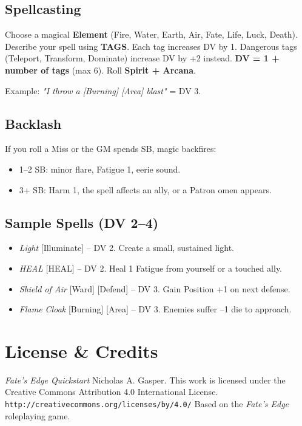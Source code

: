 \documentclass[10pt, twocolumn]{article}
\begin{document}
\subsection*{Spellcasting}
Choose a magical \textbf{Element} (Fire, Water, Earth, Air, Fate, Life, Luck, Death). Describe your spell using \textbf{TAGS}. Each tag increases DV by 1. Dangerous tags (Teleport, Transform, Dominate) increase DV by +2 instead.  
\textbf{DV = 1 + number of tags} (max 6). Roll \textbf{Spirit + Arcana}.

Example: \textit{"I throw a [Burning] [Area] blast"} = DV 3.

\subsection*{Backlash}
If you roll a Miss or the GM spends SB, magic backfires:
\begin{itemize}
\item 1--2 SB: minor flare, Fatigue 1, eerie sound.
\item 3+ SB: Harm 1, the spell affects an ally, or a Patron omen appears.
\end{itemize}

\subsection*{Sample Spells (DV 2--4)}
\begin{itemize}
\item \textit{Light} [Illuminate] -- DV 2. Create a small, sustained light.
\item \textit{HEAL} [HEAL] -- DV 2. Heal 1 Fatigue from yourself or a touched ally.
\item \textit{Shield of Air} [Ward] [Defend] -- DV 3. Gain Position +1 on next defense.
\item \textit{Flame Cloak} [Burning] [Area] -- DV 3. Enemies suffer --1 die to approach.
\end{itemize}

\section*{License \& Credits}
\textit{Fate's Edge Quickstart} \textcopyright{} Nicholas A. Gasper. This work is licensed under the Creative Commons Attribution 4.0 International License. \texttt{http://creativecommons.org/licenses/by/4.0/}  
Based on the \textit{Fate's Edge} roleplaying game.  
\end{document}
